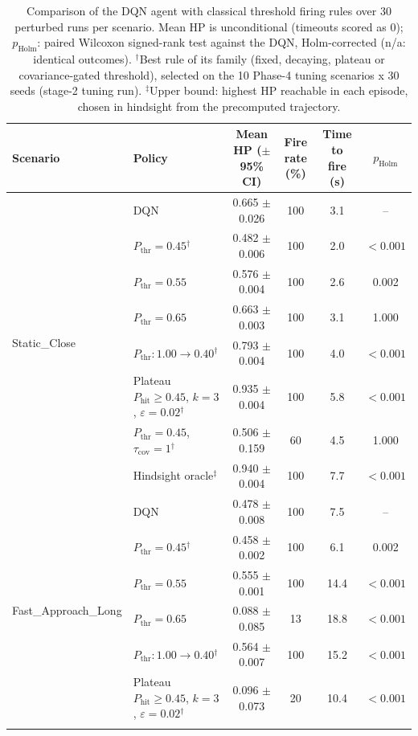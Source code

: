 \begin{table}[htbp]
\centering
\caption{Comparison of the DQN agent with classical threshold firing rules over 30 perturbed runs per scenario. Mean HP is unconditional (timeouts scored as 0); $p_{\mathrm{Holm}}$: paired Wilcoxon signed-rank test against the DQN, Holm-corrected (n/a: identical outcomes). $^{\dagger}$Best rule of its family (fixed, decaying, plateau or covariance-gated threshold), selected on the 10 Phase-4 tuning scenarios x 30 seeds (stage-2 tuning run). $^{\ddagger}$Upper bound: highest HP reachable in each episode, chosen in hindsight from the precomputed trajectory.}
\label{tab:comparison-traditional-rl}
\small
\begin{tabular}{llcccc}
\toprule
\textbf{Scenario} & \textbf{Policy} & \textbf{Mean HP ($\pm$95\% CI)} & \textbf{Fire rate (\%)} & \textbf{Time to fire (s)} & $p_{\mathrm{Holm}}$ \\
\midrule
\multirow{8}{*}{Static\_Close} & DQN & 0.665 $\pm$ 0.026 & 100 & 3.1 & -- \\
 & $P_{\mathrm{thr}}=0.45$$^{\dagger}$ & 0.482 $\pm$ 0.006 & 100 & 2.0 & $<0.001$ \\
 & $P_{\mathrm{thr}}=0.55$ & 0.576 $\pm$ 0.004 & 100 & 2.6 & 0.002 \\
 & $P_{\mathrm{thr}}=0.65$ & 0.663 $\pm$ 0.003 & 100 & 3.1 & 1.000 \\
 & $P_{\mathrm{thr}}: 1.00 \to 0.40$$^{\dagger}$ & 0.793 $\pm$ 0.004 & 100 & 4.0 & $<0.001$ \\
 & Plateau $P_{\mathrm{hit}}\geq0.45$, $k=3$, $\varepsilon=0.02$$^{\dagger}$ & 0.935 $\pm$ 0.004 & 100 & 5.8 & $<0.001$ \\
 & $P_{\mathrm{thr}}=0.45$, $\tau_{\mathrm{cov}}=1$$^{\dagger}$ & 0.506 $\pm$ 0.159 & 60 & 4.5 & 1.000 \\
 & Hindsight oracle$^{\ddagger}$ & 0.940 $\pm$ 0.004 & 100 & 7.7 & $<0.001$ \\
\midrule
\multirow{8}{*}{Fast\_Approach\_Long} & DQN & 0.478 $\pm$ 0.008 & 100 & 7.5 & -- \\
 & $P_{\mathrm{thr}}=0.45$$^{\dagger}$ & 0.458 $\pm$ 0.002 & 100 & 6.1 & 0.002 \\
 & $P_{\mathrm{thr}}=0.55$ & 0.555 $\pm$ 0.001 & 100 & 14.4 & $<0.001$ \\
 & $P_{\mathrm{thr}}=0.65$ & 0.088 $\pm$ 0.085 & 13 & 18.8 & $<0.001$ \\
 & $P_{\mathrm{thr}}: 1.00 \to 0.40$$^{\dagger}$ & 0.564 $\pm$ 0.007 & 100 & 15.2 & $<0.001$ \\
 & Plateau $P_{\mathrm{hit}}\geq0.45$, $k=3$, $\varepsilon=0.02$$^{\dagger}$ & 0.096 $\pm$ 0.073 & 20 & 10.4 & $<0.001$ \\
$$
\end{tabular}
\end{table}

